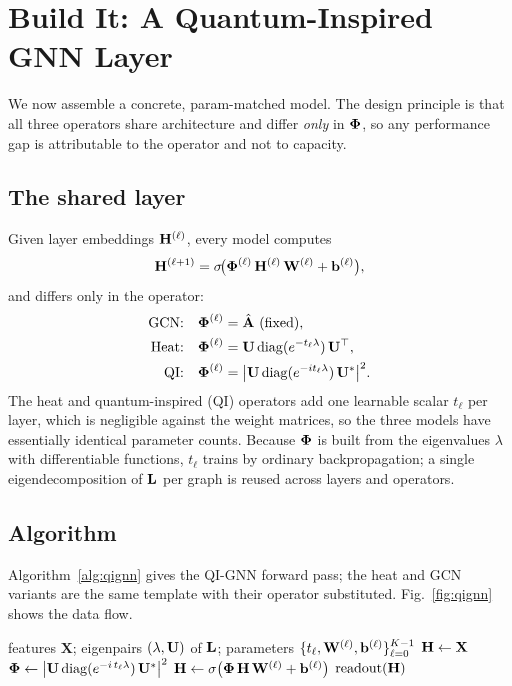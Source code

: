 \section{Build It: A Quantum-Inspired GNN Layer}
\label{sec:buildit}

We now assemble a concrete, param-matched model. The design principle is that all
three operators share architecture and differ \emph{only} in $\boldsymbol{\Phi}$, so any
performance gap is attributable to the operator and not to capacity.

\subsection{The shared layer}
Given layer embeddings $\mathbf{H}^{(\ell)}$, every model computes
\begin{equation}
\mathbf{H}^{(\ell+1)}=\sigma\!\big(\boldsymbol{\Phi}^{(\ell)}\,\mathbf{H}^{(\ell)}\,\mathbf{W}^{(\ell)}+\mathbf{b}^{(\ell)}\big),
\end{equation}
and differs only in the operator:
\begin{align}
\text{GCN:}&\quad \boldsymbol{\Phi}^{(\ell)}=\hat{\mathbf{A}}\ \text{(fixed)},\\
\text{Heat:}&\quad \boldsymbol{\Phi}^{(\ell)}=\mathbf{U}\,\mathrm{diag}(e^{-t_\ell\lambda})\,\mathbf{U}^{\top},\\
\text{QI:}&\quad \boldsymbol{\Phi}^{(\ell)}=\big|\mathbf{U}\,\mathrm{diag}(e^{-it_\ell\lambda})\,\mathbf{U}^{*}\big|^2 .
\end{align}
The heat and quantum-inspired (QI) operators add one learnable scalar $t_\ell$ per
layer, which is negligible against the weight matrices, so the three models have
essentially identical parameter counts. Because $\boldsymbol{\Phi}$ is built from the eigenvalues
$\lambda$ with differentiable functions, $t_\ell$ trains by ordinary backpropagation;
a single eigendecomposition of $\mathbf{L}$ per graph is reused across layers and operators.

\subsection{Algorithm}
Algorithm~\ref{alg:qignn} gives the QI-GNN forward pass; the heat and GCN variants
are the same template with their operator substituted. Fig.~\ref{fig:qignn} shows the
data flow.

\begin{algorithm}[t]
\caption{QI-GNN forward pass (one graph)}
\label{alg:qignn}
\begin{algorithmic}[1]
\REQUIRE features $\mathbf{X}$; eigenpairs $(\lambda,\mathbf{U})$ of $\mathbf{L}$;
parameters $\{t_\ell,\mathbf{W}^{(\ell)},\mathbf{b}^{(\ell)}\}_{\ell=0}^{K-1}$
\STATE $\mathbf{H}\leftarrow\mathbf{X}$
  \STATE $\boldsymbol{\Phi}\leftarrow\big|\mathbf{U}\,\mathrm{diag}(e^{-i\,t_\ell\lambda})\,\mathbf{U}^{*}\big|^2$
         \hfill{}
  \STATE $\mathbf{H}\leftarrow\sigma\big(\boldsymbol{\Phi}\,\mathbf{H}\,\mathbf{W}^{(\ell)}+\mathbf{b}^{(\ell)}\big)$
\ENDFOR
\RETURN $\mathrm{readout}(\mathbf{H})$
\end{algorithmic}
\end{algorithm}

